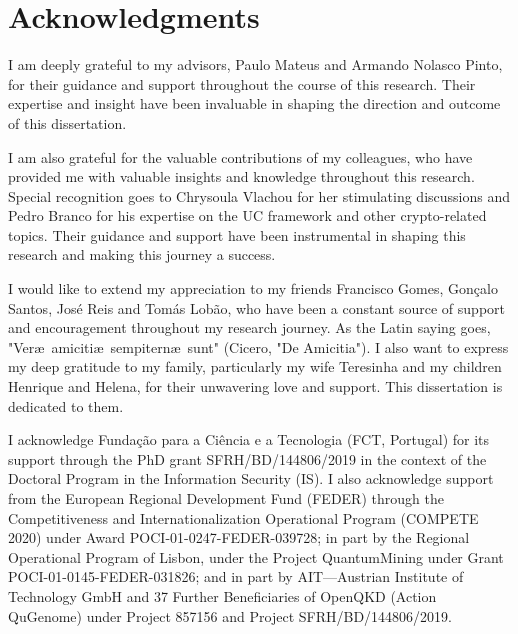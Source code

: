 

\chapter*{Acknowledgments}

I am deeply grateful to my advisors, Paulo Mateus and Armando Nolasco Pinto, for their guidance and support throughout the course of this research. Their expertise and insight have been invaluable in shaping the direction and outcome of this dissertation.


I am also grateful for the valuable contributions of my colleagues, who have provided me with valuable insights and knowledge throughout this research. Special recognition goes to Chrysoula Vlachou for her stimulating discussions and Pedro Branco for his expertise on the UC framework and other crypto-related topics. Their guidance and support have been instrumental in shaping this research and making this journey a success.

I would like to extend my appreciation to my friends Francisco Gomes, Gonçalo Santos, José Reis and Tomás Lobão, who have been a constant source of support and encouragement throughout my research journey. As the Latin saying goes, "Ver\ae\ amiciti\ae\ sempitern\ae\ sunt" (Cicero, "De Amicitia"). I also want to express my deep gratitude to my family, particularly my wife Teresinha and my children Henrique and Helena, for their unwavering love and support. This dissertation is dedicated to them.

\vfill
\begin{center}\begin{footnotesize}
I acknowledge Funda\c{c}\~{a}o para a Ci\^{e}ncia e a Tecnologia (FCT, Portugal) for its support through the PhD grant SFRH/BD/144806/2019 in the context of the Doctoral Program in the Information Security (IS). I also acknowledge support from the European Regional Development Fund (FEDER) through the Competitiveness and
Internationalization Operational Program (COMPETE 2020) under Award POCI-01-0247-FEDER-039728; in part by the Regional Operational Program of Lisbon, under the Project QuantumMining under Grant POCI-01-0145-FEDER-031826; and in part by AIT—Austrian Institute of Technology GmbH and 37 Further Beneficiaries of OpenQKD (Action QuGenome) under Project 857156 and Project SFRH/BD/144806/2019.

\end{footnotesize}
\end{center}

